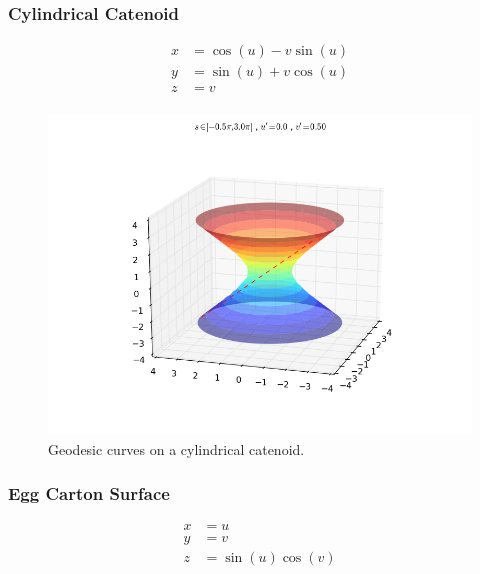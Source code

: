 \documentclass[main.tex]{subfiles}
\begin{document}
\subsubsection{Cylindrical Catenoid}

\begin{align*}
    x &= \cos(u) - v\sin(u)\\
    y &= \sin(u) + v\cos(u)\\
    z &= v\\
\end{align*}


\begin{figure}[H]
\centering
\includegraphics[scale=0.45,natwidth=812,natheight=612]
{../figures/geodesic_curve_on_catenoid.png}
\caption[Geodesic curves on a cylindrical catenoid.]{Geodesic curves on a cylindrical catenoid.}
\end{figure}


\subsubsection{Egg Carton Surface}

\begin{align*}
    x &= u\\
    y &= v\\
    z &= \sin(u)\cos(v)\\
\end{align*}
\end{document}
